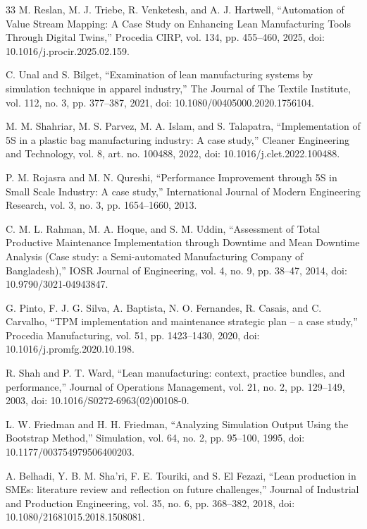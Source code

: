\documentclass[12pt,a4paper]{article}
\begin{document}
\begin{thebibliography}{33}
M. Reslan, M. J. Triebe, R. Venketesh, and A. J. Hartwell, ``Automation of Value Stream Mapping: A Case Study on Enhancing Lean Manufacturing Tools Through Digital Twins,'' Procedia CIRP, vol. 134, pp. 455--460, 2025, doi: 10.1016/j.procir.2025.02.159.

C. Unal and S. Bilget, ``Examination of lean manufacturing systems by simulation technique in apparel industry,'' The Journal of The Textile Institute, vol. 112, no. 3, pp. 377--387, 2021, doi: 10.1080/00405000.2020.1756104.

M. M. Shahriar, M. S. Parvez, M. A. Islam, and S. Talapatra, ``Implementation of 5S in a plastic bag manufacturing industry: A case study,'' Cleaner Engineering and Technology, vol. 8, art. no. 100488, 2022, doi: 10.1016/j.clet.2022.100488.

P. M. Rojasra and M. N. Qureshi, ``Performance Improvement through 5S in Small Scale Industry: A case study,'' International Journal of Modern Engineering Research, vol. 3, no. 3, pp. 1654--1660, 2013.

C. M. L. Rahman, M. A. Hoque, and S. M. Uddin, ``Assessment of Total Productive Maintenance Implementation through Downtime and Mean Downtime Analysis (Case study: a Semi-automated Manufacturing Company of Bangladesh),'' IOSR Journal of Engineering, vol. 4, no. 9, pp. 38--47, 2014, doi: 10.9790/3021-04943847.

G. Pinto, F. J. G. Silva, A. Baptista, N. O. Fernandes, R. Casais, and C. Carvalho, ``TPM implementation and maintenance strategic plan -- a case study,'' Procedia Manufacturing, vol. 51, pp. 1423--1430, 2020, doi: 10.1016/j.promfg.2020.10.198.

R. Shah and P. T. Ward, ``Lean manufacturing: context, practice bundles, and performance,'' Journal of Operations Management, vol. 21, no. 2, pp. 129--149, 2003, doi: 10.1016/S0272-6963(02)00108-0.

L. W. Friedman and H. H. Friedman, ``Analyzing Simulation Output Using the Bootstrap Method,'' Simulation, vol. 64, no. 2, pp. 95--100, 1995, doi: 10.1177/003754979506400203.

A. Belhadi, Y. B. M. Sha'ri, F. E. Touriki, and S. El Fezazi, ``Lean production in SMEs: literature review and reflection on future challenges,'' Journal of Industrial and Production Engineering, vol. 35, no. 6, pp. 368--382, 2018, doi: 10.1080/21681015.2018.1508081.


\end{thebibliography}
\end{document}

